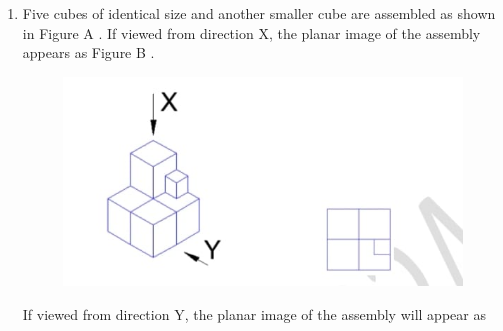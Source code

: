 \documentclass[journal,12pt,onecolumn]{article}
\theoremstyle{remark}
\begin{document}
\begin{enumerate}
    \item Five cubes of identical size and another smaller cube are assembled as shown in
    Figure A . If viewed from direction X, the planar image of the assembly appears as
    Figure B .
    \begin{figure}[H]
        \centering
        \includegraphics[width=0.7\columnwidth]{figs/2Q9.jpg}
        \caption{}
        \label{fig:q9a}
    \end{figure}
    
    If viewed from direction Y, the planar image of the assembly  will
    appear as
    

\end{enumerate}
\end{document}
